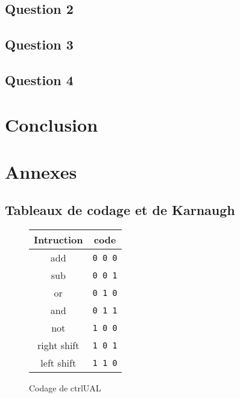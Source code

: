 \documentclass[10pt,a4paper]{article}
\begin{document}
\subsection{Question 2}

\subsection{Question 3}

\subsection{Question 4}

\section{Conclusion}

\section{Annexes}

\subsection{Tableaux de codage et de Karnaugh}

\begin{figure}[h]
\centering
\begin{tabular}{|c|c|}
 \hline
 \textbf{Intruction} & \textbf{code} \\
 \hline
 add & \verb|0 0 0| \\
 \hline
 sub & \verb|0 0 1| \\
 \hline
 or & \verb|0 1 0| \\
 \hline
 and & \verb|0 1 1| \\
 \hline
 not & \verb|1 0 0| \\
 \hline
 right shift & \verb|1 0 1| \\
 \hline
 left shift & \verb|1 1 0| \\
 \hline
\end{tabular}
\caption{Codage de ctrlUAL}
\label{code_ctrlUAL}
\end{figure}
\end{document}
